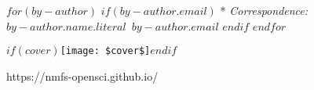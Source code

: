 \begin{minipage}[b][\textheight][s]{0.85\textwidth}
\vspace{1\baselineskip} 

$for(by-author)$
$if(by-author.email)$
* \textit{Correspondence:}~$by-author.name.literal$~$by-author.email$
$endif$
$endfor$


\vfill

$if(cover)$\texttt{[image: \$cover\$]}$endif$

\vspace{0.1\textheight} 

{\noindent https://nmfs-opensci.github.io/}\\[\baselineskip]
\end{minipage}
